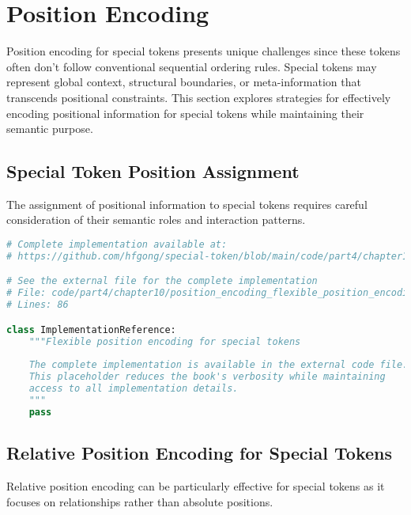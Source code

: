 
\section{Position Encoding}

Position encoding for special tokens presents unique challenges since these tokens often don't follow conventional sequential ordering rules. Special tokens may represent global context, structural boundaries, or meta-information that transcends positional constraints. This section explores strategies for effectively encoding positional information for special tokens while maintaining their semantic purpose.

\subsection{Special Token Position Assignment}

The assignment of positional information to special tokens requires careful consideration of their semantic roles and interaction patterns.

\begin{lstlisting}[language=Python, caption={Flexible position encoding for special tokens}]
# Complete implementation available at:
# https://github.com/hfgong/special-token/blob/main/code/part4/chapter10/position_encoding_flexible_position_encoding_for.py

# See the external file for the complete implementation
# File: code/part4/chapter10/position_encoding_flexible_position_encoding_for.py
# Lines: 86

class ImplementationReference:
    """Flexible position encoding for special tokens
    
    The complete implementation is available in the external code file.
    This placeholder reduces the book's verbosity while maintaining
    access to all implementation details.
    """
    pass
\end{lstlisting}

\subsection{Relative Position Encoding for Special Tokens}

Relative position encoding can be particularly effective for special tokens as it focuses on relationships rather than absolute positions.

